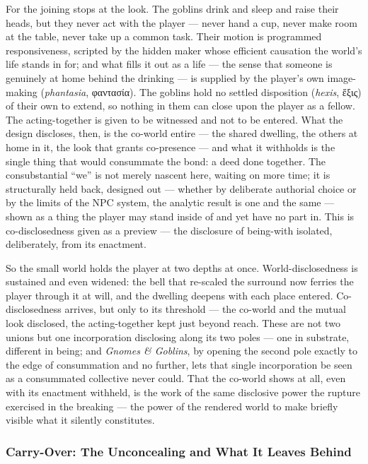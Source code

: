 \documentclass{article}
\newcommand{\gk}[1]{{\greekfont #1}}
\begin{document}
For the joining stops at the look. The goblins drink and sleep and raise their heads, but they never act with the player — never hand a cup, never make room at the table, never take up a common task. Their motion is programmed responsiveness, scripted by the hidden maker whose efficient causation the world's life stands in for; and what fills it out as a life — the sense that someone is genuinely at home behind the drinking — is supplied by the player's own image-making (\textit{phantasia}, \gk{φαντασία}). The goblins hold no settled disposition (\textit{hexis}, \gk{ἕξις}) of their own to extend, so nothing in them can close upon the player as a fellow. The acting-together is given to be witnessed and not to be entered. What the design discloses, then, is the co-world entire — the shared dwelling, the others at home in it, the look that grants co-presence — and what it withholds is the single thing that would consummate the bond: a deed done together. The consubstantial ``we'' is not merely nascent here, waiting on more time; it is structurally held back, designed out — whether by deliberate authorial choice or by the limits of the NPC system, the analytic result is one and the same — shown as a thing the player may stand inside of and yet have no part in. This is co-disclosedness given as a preview — the disclosure of being-with isolated, deliberately, from its enactment.

So the small world holds the player at two depths at once. World-disclosedness is sustained and even widened: the bell that re-scaled the surround now ferries the player through it at will, and the dwelling deepens with each place entered. Co-disclosedness arrives, but only to its threshold — the co-world and the mutual look disclosed, the acting-together kept just beyond reach. These are not two unions but one incorporation disclosing along its two poles — one in substrate, different in being; and \textit{Gnomes \& Goblins}, by opening the second pole exactly to the edge of consummation and no further, lets that single incorporation be seen as a consummated collective never could. That the co-world shows at all, even with its enactment withheld, is the work of the same disclosive power the rupture exercised in the breaking — the power of the rendered world to make briefly visible what it silently constitutes.

\subsubsection*{Carry-Over: The Unconcealing and What It Leaves Behind}
\end{document}
